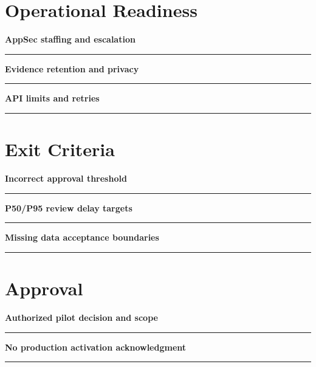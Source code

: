 \documentclass[11pt,letterpaper]{article}
\begin{document}
\section{Operational Readiness}
\noindent\textbf{AppSec staffing and escalation}\par
\vspace{1.1em}\noindent\rule{0.96\linewidth}{0.4pt}\par\vspace{0.65em}
\noindent\textbf{Evidence retention and privacy}\par
\vspace{1.1em}\noindent\rule{0.96\linewidth}{0.4pt}\par\vspace{0.65em}
\noindent\textbf{API limits and retries}\par
\vspace{1.1em}\noindent\rule{0.96\linewidth}{0.4pt}\par\vspace{0.65em}
\section{Exit Criteria}
\noindent\textbf{Incorrect approval threshold}\par
\vspace{1.1em}\noindent\rule{0.96\linewidth}{0.4pt}\par\vspace{0.65em}
\noindent\textbf{P50/P95 review delay targets}\par
\vspace{1.1em}\noindent\rule{0.96\linewidth}{0.4pt}\par\vspace{0.65em}
\noindent\textbf{Missing data acceptance boundaries}\par
\vspace{1.1em}\noindent\rule{0.96\linewidth}{0.4pt}\par\vspace{0.65em}
\section{Approval}
\noindent\textbf{Authorized pilot decision and scope}\par
\vspace{1.1em}\noindent\rule{0.96\linewidth}{0.4pt}\par\vspace{0.65em}
\noindent\textbf{No production activation acknowledgment}\par
\vspace{1.1em}\noindent\rule{0.96\linewidth}{0.4pt}\par\vspace{0.65em}
\end{document}
